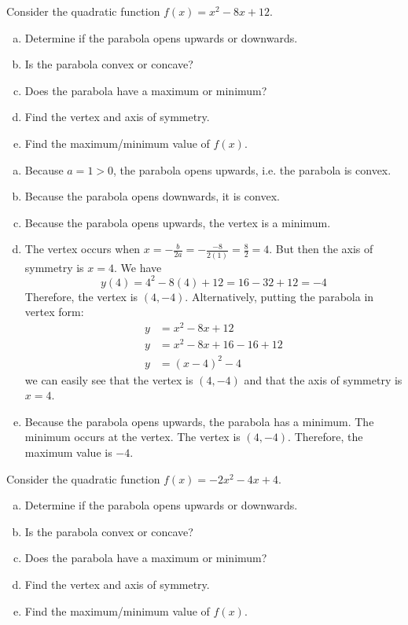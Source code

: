 \documentclass[11pt,letterpaper]{article}
\begin{document}
 Consider the quadratic function $f(x)= x^2 - 8x + 12$.
\begin{enumerate}[(a)]
\item Determine if the parabola opens upwards or downwards.
\item Is the parabola convex or concave?
\item Does the parabola have a maximum or minimum? 
\item Find the vertex and axis of symmetry. 
\item Find the maximum/minimum value of $f(x)$. 
\end{enumerate} \pspace

\sol
\begin{enumerate}[(a)]
\item Because $a= 1 > 0$, the parabola opens upwards, i.e. the parabola is convex. \pspace

\item Because the parabola opens downwards, it is convex. \pspace

\item Because the parabola opens upwards, the vertex is a minimum. \pspace

\item The vertex occurs when $x= -\frac{b}{2a}= -\frac{-8}{2(1)}= \frac{8}{2}= 4$. But then the axis of symmetry is $x= 4$. We have
	\[
	y(4)= 4^2 - 8(4) + 12= 16 - 32 + 12= -4
	\]
Therefore, the vertex is $(4, -4)$. Alternatively, putting the parabola in vertex form:
	\[
	\begin{aligned}
	y&= x^2 - 8x + 12 \\[0.3cm]
	y&= x^2 - 8x + 16 - 16 + 12 \\[0.3cm]
	y&= (x - 4)^2 - 4
	\end{aligned}
	\]
we can easily see that the vertex is $(4, -4)$ and that the axis of symmetry is $x= 4$. \pspace

\item Because the parabola opens upwards, the parabola has a minimum. The minimum occurs at the vertex. The vertex is $(4, -4)$. Therefore, the maximum value is $-4$. 
\end{enumerate}





\newpage





 Consider the quadratic function $f(x)= -2x^2 - 4x + 4$.
\begin{enumerate}[(a)]
\item Determine if the parabola opens upwards or downwards.
\item Is the parabola convex or concave?
\item Does the parabola have a maximum or minimum? 
\item Find the vertex and axis of symmetry. 
\item Find the maximum/minimum value of $f(x)$. 
\end{enumerate} \pspace
\end{document}
